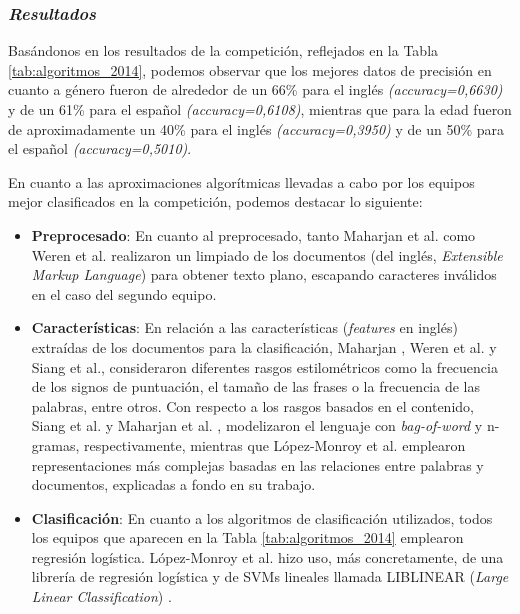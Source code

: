 \subsubsection{\textit{Resultados}}

Basándonos en los resultados de la competición, reflejados en la Tabla \ref{tab:algoritmos_2014}, podemos observar que los mejores datos de precisión
en cuanto a género fueron de alrededor de un 66\% para el inglés \textit{(accuracy=0,6630)} y de un 61\% para el español \textit{(accuracy=0,6108)}, mientras que para la edad fueron de aproximadamente un 40\% para el inglés
\textit{(accuracy=0,3950)} y de un 50\% para el español \textit{(accuracy=0,5010)}.

\bigskip
En cuanto a las aproximaciones algorítmicas llevadas a cabo por los equipos mejor clasificados en la competición, podemos destacar lo siguiente:

\begin{itemize}
	\item \textbf{Preprocesado}: En cuanto al preprocesado, tanto Maharjan et al. \cite{maharjan2014simple} como Weren et al. \cite{weren2014exploring} realizaron un limpiado de los documentos
	      (del inglés, \textit{Extensible Markup Language}) para obtener texto plano, escapando caracteres inválidos en el caso del segundo equipo.
	\item \textbf{Características}: En relación a las características (\textit{features} en inglés) extraídas de los documentos para la clasificación, Maharjan \cite{maharjan2014simple}, Weren et al. \cite{weren2014exploring} y Siang et al.,
	      consideraron diferentes rasgos estilométricos como la frecuencia de los signos de puntuación, el tamaño de las frases o la frecuencia de las palabras, entre otros. Con respecto
	      a los rasgos basados en el contenido, Siang et al. y Maharjan et al. \cite{maharjan2014simple}, modelizaron el lenguaje con \textit{bag-of-word} y n-gramas, respectivamente, mientras
	      que López-Monroy et al. \cite{lopez2014using} emplearon representaciones más complejas basadas en las relaciones entre palabras y documentos, explicadas a fondo
	      en su trabajo.
	\item \textbf{Clasificación}: En cuanto a los algoritmos de clasificación utilizados, todos los equipos que aparecen en la Tabla \ref{tab:algoritmos_2014} emplearon regresión logística. López-Monroy et al. \cite{lopez2014using}
	      hizo uso, más concretamente, de una librería de regresión logística y de SVMs lineales llamada LIBLINEAR (\textit{Large Linear Classification}) \cite{fan2008liblinear}.
\end{itemize}

